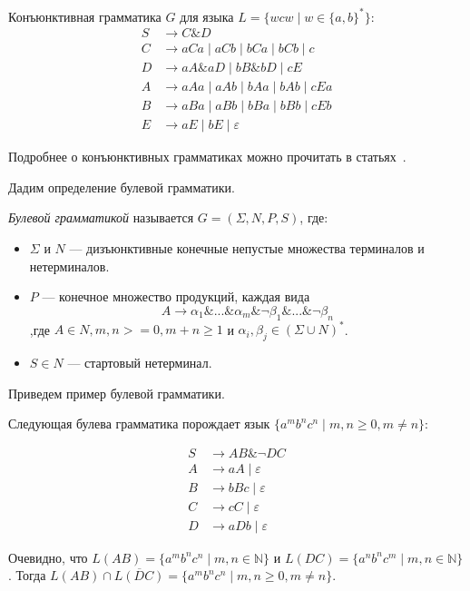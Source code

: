 \begin{example}
    Конъюнктивная грамматика $G$ для языка $L = \{wcw \mid w \in \{a, b\}^*\}$:
    \begin{align*}
	S &\to C \& D \\ 
	C &\to aCa \mid aCb \mid bCa \mid bCb \mid c \\ 
	D &\to aA\&aD \mid bB\&bD \mid cE \\
	A &\to aAa \mid aAb \mid bAa \mid bAb \mid cEa \\
	B &\to aBa \mid aBb \mid bBa \mid bBb \mid cEb \\
	E &\to aE \mid bE \mid \varepsilon
	\end{align*}
\end{example}

Подробнее о конъюнктивных грамматиках можно прочитать в статьях~\cite{DBLP:journals/jalc/Okhotin01, Okhotin2002, DBLP:journals/tcs/Okhotin03a, f60a33d409364914be560cac0e54b12c}.

Дадим определение булевой грамматики.

\begin{definition}
	\textit{Булевой грамматикой} называется $G = (\Sigma,N,P,S)$, где:
	\begin{itemize}
		\item $\Sigma$ и $N$ --- дизъюнктивные конечные непустые множества терминалов и нетерминалов.
		\item $P$ --- конечное множество продукций, каждая вида
		\[
		A\rightarrow \alpha_1\&...\&\alpha_m\&\neg\beta_1\&...\&\neg\beta_n
		\]
		,где $A \in N, m, n >=0, m+n \geq 1$ и $\alpha_i,\beta_j \in (\Sigma \cup N)^*$.
		\item $S \in N$  --- стартовый нетерминал.
	\end{itemize}
\end{definition}

Приведем пример булевой грамматики.

\begin{example}
	Следующая булева грамматика порождает язык  $\{a^mb^nc^n\mid m,n \geq 0, m \neq n \}$:
	
	\begin{align*}
	S   &\to A B \& \neg D C \\ 
	A  &\to a A \mid \varepsilon \\ 
	B &\to b B c \mid \varepsilon \\
	C   &\to c C \mid \varepsilon \\ 
	D   &\to aDb \mid \varepsilon
	\end{align*}
	
	Очевидно, что $L(AB) = \{a^mb^nc^n\mid m,n \in \mathbb{N}\}$ и $L(DC) = \{a^nb^nc^m\mid m,n \in \mathbb{N}\}$. Тогда $L(AB)\cap\overline{L(DC)} = \{a^mb^nc^n\mid m,n \geq 0, m \neq n \}$.
\end{example}

